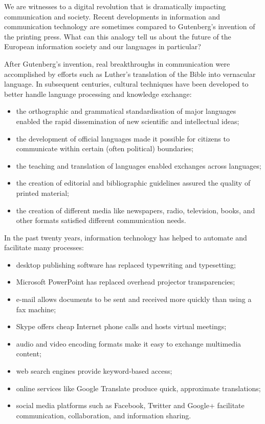 \documentclass[]{../../metanetpaper}
\begin{document}
\begin{multicols}{2}
We are witnesses to a digital revolution that is dramatically impacting communication and society. Recent developments in information and communication technology are sometimes compared to Gutenberg’s invention of the printing press. What can this analogy tell us about the future of the European information society and our languages in particular?


After Gutenberg’s invention, real breakthroughs in communication were accomplished by efforts such as Luther’s translation of the Bible into vernacular language. In subsequent centuries, cultural techniques have been developed to better handle language processing and knowledge exchange:

\begin{itemize}
\item the orthographic and grammatical standardisation of major languages enabled the rapid dissemination of new scientific and intellectual ideas;
\item the development of official languages made it possible for citizens to communicate within certain (often political) boundaries;
\item the teaching and translation of languages enabled exchanges across languages;
\item the creation of editorial and bibliographic guidelines assured the quality of printed material;
\item the creation of different media like newspapers, radio, television, books, and other formats satisfied different communication needs. 
\end{itemize}

In the past twenty years, information technology has helped to automate and facilitate many processes:

\begin{itemize}
\item desktop publishing software has replaced typewriting and typesetting;
\item Microsoft PowerPoint has replaced overhead projector transparencies;
\item e-mail allows documents to be sent and received more quickly than using a fax machine;
\item Skype offers cheap Internet phone calls and hosts virtual meetings;
\item audio and video encoding formats make it easy to exchange multimedia content;
\item web search engines provide keyword-based access;
\item online services like Google Translate produce quick, approximate translations;
\item social media platforms such as Facebook, Twitter and Google+ facilitate communication, collaboration, and information sharing.
\end{itemize}


\end{multicols}
\end{document}
